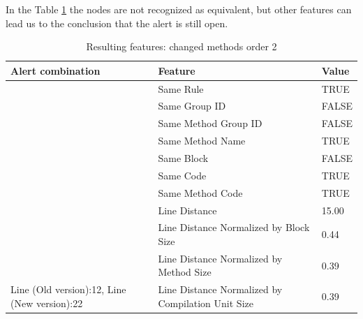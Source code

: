 \documentclass[
]{article}
\begin{document}
\newpage

In the Table \ref{changing_method_order_2} the nodes are not recognized
as equivalent, but other features can lead us to the conclusion that the
alert is still open.

\small

\begin{table}[!h]

\caption{\label{tab:unnamed-chunk-20}Resulting features: changed methods order 2 \label{changing_method_order_2} }
\centering
\begin{tabular}[t]{l|l|l}
\hline
Alert combination & Feature & Value\\
\hline
\rowcolor{gray!6}   & Same Rule & TRUE\\

 & Same Group ID & FALSE\\

\rowcolor{gray!6}   & Same Method Group ID & FALSE\\

 & Same Method Name & TRUE\\

\rowcolor{gray!6}   & Same Block & FALSE\\

 & Same Code & TRUE\\

\rowcolor{gray!6}   & Same Method Code & TRUE\\

 & Line Distance & 15.00\\

\rowcolor{gray!6}   & Line Distance Normalized by Block Size & 0.44\\

 & Line Distance Normalized by Method Size & 0.39\\

\multirow[t]{-11}{*}{\raggedright\arraybackslash Line (Old version):12, Line (New version):22} & Line Distance Normalized by Compilation Unit Size & 0.39\\
\hline
\end{tabular}
\end{table}

\normalsize
\end{document}
